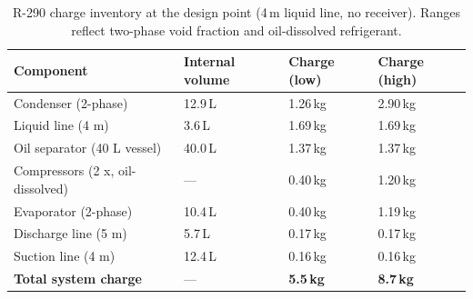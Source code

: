 \begin{table}[h!]
\caption{R-290 charge inventory at the design point (4\,m liquid line, no receiver). Ranges reflect two-phase void fraction and oil-dissolved refrigerant.}
\label{tab:charge_inventory}
\begin{tabularx}{\linewidth}{lLLL}
\toprule
\textbf{Component} & \textbf{Internal volume} & \textbf{Charge (low)} & \textbf{Charge (high)} \\
\midrule
Condenser (2-phase) & 12.9\,L & 1.26\,kg & 2.90\,kg \\
Liquid line (4 m) & 3.6\,L & 1.69\,kg & 1.69\,kg \\
Oil separator (40 L vessel) & 40.0\,L & 1.37\,kg & 1.37\,kg \\
Compressors (2 x, oil-dissolved) & --- & 0.40\,kg & 1.20\,kg \\
Evaporator (2-phase) & 10.4\,L & 0.40\,kg & 1.19\,kg \\
Discharge line (5 m) & 5.7\,L & 0.17\,kg & 0.17\,kg \\
Suction line (4 m) & 12.4\,L & 0.16\,kg & 0.16\,kg \\
\midrule
\textbf{Total system charge} & --- & \textbf{5.5\,kg} & \textbf{8.7\,kg} \\
\bottomrule
\end{tabularx}
\end{table}
